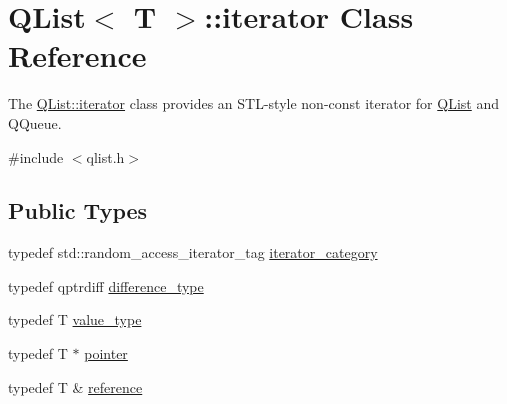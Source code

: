 \hypertarget{class_q_list_1_1iterator}{}\section{Q\+List$<$ T $>$\+:\+:iterator Class Reference}
\label{class_q_list_1_1iterator}


The \hyperlink{class_q_list_1_1iterator}{Q\+List\+::iterator} class provides an S\+T\+L-\/style non-\/const iterator for \hyperlink{class_q_list}{Q\+List} and Q\+Queue.  




{\ttfamily \#include $<$qlist.\+h$>$}

\subsection*{Public Types}
\begin{DoxyCompactItemize}
\item 
typedef std\+::random\+\_\+access\+\_\+iterator\+\_\+tag \hyperlink{class_q_list_1_1iterator_aef6f10c045692f5c9f82a9a629e76a82}{iterator\+\_\+category}
\item 
typedef qptrdiff \hyperlink{class_q_list_1_1iterator_a6360336f54f546a21d69e233f8334fc5}{difference\+\_\+type}
\item 
typedef T \hyperlink{class_q_list_1_1iterator_aab450769169fdaaabc317ed16833d3fb}{value\+\_\+type}
\item 
typedef T $\ast$ \hyperlink{class_q_list_1_1iterator_a07f26136c3c7f042cce2f522ecf15f17}{pointer}
\item 
typedef T \& \hyperlink{class_q_list_1_1iterator_aadf226cf04225b39acd26973c72681bc}{reference}
\end{DoxyCompactItemize}
